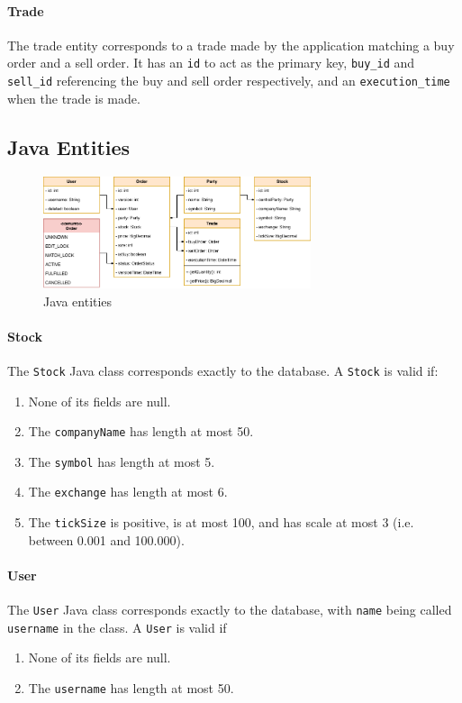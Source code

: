 \documentclass{article}
\begin{document}
\paragraph{Trade} The trade entity corresponds to a trade made by the application matching a buy order and a sell order. It has an \texttt{id} to act as the primary key, \texttt{buy\_id} and \texttt{sell\_id} referencing the buy and sell order respectively, and an \texttt{execution\_time} when the trade is made.

\subsection{Java Entities}

\begin{figure}[h]
    \centering
    \includegraphics[width=0.7\textwidth]{entities.png}
    \caption{Java entities}
\end{figure}

\paragraph{Stock} The \texttt{Stock} Java class corresponds exactly to the database. A \texttt{Stock} is valid if:
\begin{enumerate}
    \item None of its fields are null.
    \item The \texttt{companyName} has length at most 50.
    \item The \texttt{symbol} has length at most 5.
    \item The \texttt{exchange} has length at most 6.
    \item The \texttt{tickSize} is positive, is at most 100, and has scale at most 3 (i.e. between 0.001 and 100.000).
\end{enumerate}


\paragraph{User} The \texttt{User} Java class corresponds exactly to the database, with \texttt{name} being called \texttt{username} in the class. A \texttt{User} is valid if
\begin{enumerate}
    \item None of its fields are null.
    \item The \texttt{username} has length at most 50.
\end{enumerate}
\end{document}

